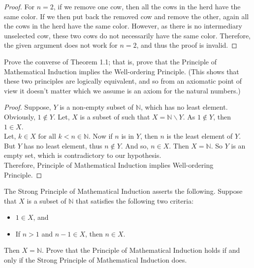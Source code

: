 \documentclass[12pt]{article}
\newenvironment{problem}[2][Problem]{\begin{trivlist}
\item[\hskip \labelsep {\bfseries #1}\hskip \labelsep {\bfseries #2.}]}{\end{trivlist}}
\begin{document}
\begin{proof}
For \( n = 2 \), if we remove one cow, then all the cows in the herd have the same color. If we then put back the removed cow and remove the other, again all the cows in the herd have the same color. However, as there is no intermediary unselected cow, these two cows do not necessarily have the same color. Therefore, the given argument does not work for \( n = 2 \), and thus the proof is invalid.

\end{proof}

\begin{problem}{16}
Prove the converse of Theorem 1.1; that is, prove that the Principle of Mathematical Induction implies the Well-ordering Principle. (This shows that these two principles are logically equivalent, and so from an axiomatic point of view it doesn't matter which we assume is an axiom for the natural numbers.)

\end{problem}

\begin{proof}
Suppose, $Y$ is a non-empty subset of $\mathbb{N}$, which has no least element. Obviously, $1 \not \in Y$. Let, $X$ is a subset of such that $X = \mathbb{N}\backslash Y$. As $1 \not \in Y$, then $1 \in X.$ \\
Let, $k \in X \text{ for all } k < n \in \mathbb{N}$. Now if $n$ is in $Y$, then $n$ is the least element of $Y$. But $Y$ has no least element, thus $n \not \in Y$. And so, $n \in X$. Then $X = \mathbb{N}$. So $Y$ is an empty set, which is contradictory to our hypothesis.\\
Therefore, Principle of Mathematical Induction implies Well-ordering Principle.

\end{proof}

\begin{problem}{17}
The Strong Principle of Mathematical Induction asserts the following. Suppose that
\( X \) is a subset of \( \mathbb{N} \) that satisfies the following two criteria:
\begin{itemize}
    \item[(a)] \( 1 \in X \), and
    \item[(b)] If \( n > 1 \) and \( n - 1 \in X \), then \( n \in X \).
\end{itemize}
Then \( X = \mathbb{N} \). Prove that the Principle of Mathematical Induction holds if and only if
the Strong Principle of Mathematical Induction does.

\end{problem}
\end{document}
